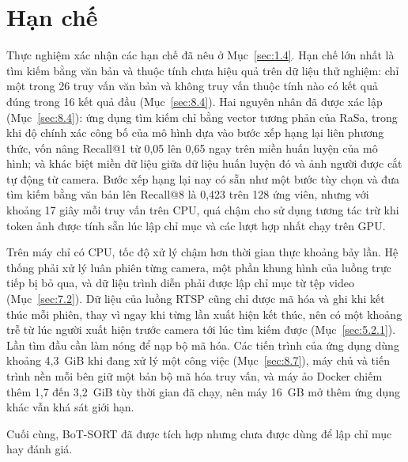 \section{Hạn chế}
\label{sec:9.2}

Thực nghiệm xác nhận các hạn chế đã nêu ở Mục~\ref{sec:1.4}. Hạn chế lớn nhất là tìm kiếm bằng văn bản và thuộc tính chưa hiệu quả trên dữ liệu thử nghiệm: chỉ một trong 26 truy vấn văn bản và không truy vấn thuộc tính nào có kết quả đúng trong 16 kết quả đầu (Mục~\ref{sec:8.4}). Hai nguyên nhân đã được xác lập (Mục~\ref{sec:8.4}): ứng dụng tìm kiếm chỉ bằng vector tương phản của RaSa, trong khi độ chính xác công bố của mô hình dựa vào bước xếp hạng lại liên phương thức, vốn nâng Recall@1 từ 0,05 lên 0,65 ngay trên miền huấn luyện của mô hình; và khác biệt miền dữ liệu giữa dữ liệu huấn luyện đó và ảnh người được cắt tự động từ camera. Bước xếp hạng lại nay có sẵn như một bước tùy chọn và đưa tìm kiếm bằng văn bản lên Recall@8 là 0,423 trên 128 ứng viên, nhưng với khoảng 17 giây mỗi truy vấn trên CPU, quá chậm cho sử dụng tương tác trừ khi token ảnh được tính sẵn lúc lập chỉ mục và các lượt hợp nhất chạy trên GPU.

Trên máy chỉ có CPU, tốc độ xử lý chậm hơn thời gian thực khoảng bảy lần. Hệ thống phải xử lý luân phiên từng camera, một phần khung hình của luồng trực tiếp bị bỏ qua, và dữ liệu trình diễn phải được lập chỉ mục từ tệp video (Mục~\ref{sec:7.2}). Dữ liệu của luồng RTSP cũng chỉ được mã hóa và ghi khi kết thúc mỗi phiên, thay vì ngay khi từng lần xuất hiện kết thúc, nên có một khoảng trễ từ lúc người xuất hiện trước camera tới lúc tìm kiếm được (Mục~\ref{sec:5.2.1}). Lần tìm đầu cần làm nóng để nạp bộ mã hóa. Các tiến trình của ứng dụng dùng khoảng 4,3~GiB khi đang xử lý một công việc (Mục~\ref{sec:8.7}), máy chủ và tiến trình nền mỗi bên giữ một bản bộ mã hóa truy vấn, và máy ảo Docker chiếm thêm 1,7 đến 3,2~GiB tùy thời gian đã chạy, nên máy 16~GB mở thêm ứng dụng khác vẫn khá sát giới hạn.

Cuối cùng, BoT-SORT đã được tích hợp nhưng chưa được dùng để lập chỉ mục hay đánh giá.
